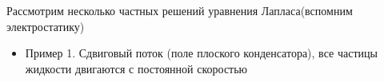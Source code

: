 Рассмотрим несколько частных решений уравнения Лапласа(вспомним электростатику)
\begin{itemize}
	\item Пример 1.
	Сдвиговый поток (поле плоского конденсатора), все частицы жидкости двигаются с постоянной скоростью

\end{itemize}